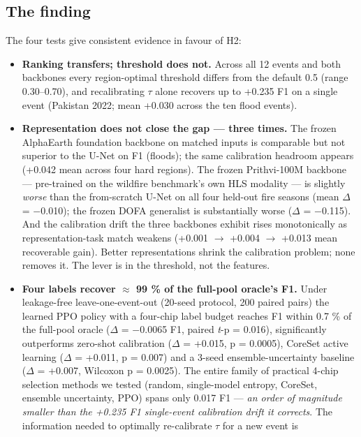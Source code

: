 \documentclass[sn-nature,lineno]{sn-jnl}
\providecommand{\tightlist}{\setlength{\itemsep}{0pt}\setlength{\parskip}{0pt}}
\theoremstyle{thmstyleone}
\theoremstyle{thmstyletwo}
\theoremstyle{thmstylethree}
\begin{document}
\subsection{The finding}\label{the-finding}

The four tests give consistent evidence in favour of H2:

\begin{itemize}
\tightlist
\item
  \textbf{Ranking transfers; threshold does not.} Across all 12 events and
  both backbones every region-optimal threshold differs from the default
  0.5 (range 0.30--0.70), and recalibrating $\tau$ alone recovers up to +0.235
  F1 on a single event (Pakistan 2022; mean +0.030 across the ten flood
  events).
\item
  \textbf{Representation does not close the gap --- three times.} The frozen
  AlphaEarth foundation backbone on matched inputs is comparable but
  not superior to the U-Net on F1 (floods); the same calibration
  headroom appears (+0.042 mean across four hard regions). The frozen
  Prithvi-100M backbone --- pre-trained on the wildfire benchmark's own
  HLS modality --- is slightly \emph{worse} than the from-scratch U-Net on
  all four held-out fire seasons (mean $\Delta$ = $-$0.010); the frozen DOFA
  generalist is substantially worse ($\Delta$ = $-$0.115). And the calibration
  drift the three backbones exhibit rises monotonically as
  representation-task match weakens (+0.001 $\rightarrow$ +0.004 $\rightarrow$ +0.013 mean
  recoverable gain). Better representations shrink the calibration
  problem; none removes it. The lever is in the threshold, not the
  features.
\item
  \textbf{Four labels recover $\approx$ 99 \% of the full-pool oracle's F1.} Under
  leakage-free leave-one-event-out (20-seed protocol, 200 paired pairs)
  the learned PPO policy with a four-chip label budget reaches F1 within
  0.7 \% of the full-pool oracle ($\Delta$ = $-$0.0065 F1, paired \emph{t}-p = 0.016),
  significantly outperforms zero-shot calibration ($\Delta$ = +0.015, p =
  0.0005), CoreSet active learning ($\Delta$ = +0.011, p = 0.007) and a
  3-seed ensemble-uncertainty baseline ($\Delta$ = +0.007, Wilcoxon p =
  0.0025). The entire family of practical 4-chip selection methods we
  tested (random, single-model entropy, CoreSet, ensemble uncertainty,
  PPO) spans only 0.017 F1 --- \emph{an order of magnitude smaller than the
  +0.235 F1 single-event calibration drift it corrects}. The
  information needed to optimally re-calibrate $\tau$ for a new event is

\end{itemize}
\end{document}

